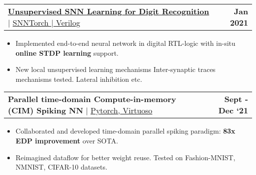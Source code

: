 \documentclass[letterpaper,11pt]{article}
\makeatletter
\newcommand{\resumeItem}[1]{
  \item\small{
    {#1 \vspace{-2pt}}
  }
}
\newcommand{\resumeProjectHeading}[2]{
    \item
    \begin{tabular*}{1\textwidth}{l@{\extracolsep{\fill}}r}
      \small#1 & \textbf{\small #2}\\
    \end{tabular*}\vspace{2pt}
}
\newcommand{\resumeItemListStart}{\begin{itemize}}
\newcommand{\resumeItemListEnd}{\end{itemize}\vspace{-5pt}}
\makeatother
\begin{document}
              \vspace{-5pt}
          \resumeProjectHeading
          {\href{https://github.com/umang-garg21/Unsupervised_SNN}{\textbf{\normalsize{Unsupervised SNN Learning for Digit Recognition}} \href{https://github.com/UMANG-GARG-UCSB/Unsupervised_SNN}{\raisebox{-0.1\height}\faExternalLink }} $|$ {\underline{SNNTorch $|$ Verilog}}}{Jan 2021}
          \resumeItemListStart
            
            \vspace{-2pt}
            \resumeItem{\normalsize{Implemented end-to-end neural network in digital RTL-logic with in-situ \textbf{online STDP learning} support.}}
            
            \vspace{2pt}
               \vspace{-2pt}
            \resumeItem{\normalsize{New local unsupervised learning mechanisms Inter-synaptic traces mechanisms tested. Lateral inhibition etc.}}

          \resumeItemListEnd 
          \vspace{-25pt}
    
    \resumeProjectHeading
          {\textbf{\normalsize{Parallel time-domain Compute-in-memory (CIM) Spiking NN}} $|$ {\underline{Pytorch, Virtuoso}}}{Sept - Dec `21}
          \resumeItemListStart
            \resumeItem{\normalsize{Collaborated and developed time-domain parallel spiking paradigm: \textbf{83x EDP improvement} over SOTA.}}
            
            \vspace{2pt}
            
            \resumeItem{\normalsize{Reimagined dataflow for better weight reuse. Tested on Fashion-MNIST, NMNIST, CIFAR-10 datasets.}}

          \resumeItemListEnd 
        
          \vspace{-10pt}
            
\end{document}

